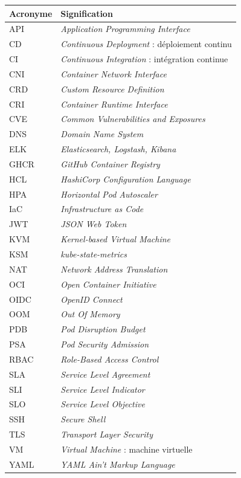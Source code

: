 \documentclass[12pt,a4paper,oneside]{report}
\begin{document}
\begin{longtable}{@{}p{3.2cm}p{11.0cm}@{}}
\toprule
\textbf{Acronyme} & \textbf{Signification} \\
\midrule
\endhead
API & \emph{Application Programming Interface} \\
CD & \emph{Continuous Deployment} : déploiement continu \\
CI & \emph{Continuous Integration} : intégration continue \\
CNI & \emph{Container Network Interface} \\
CRD & \emph{Custom Resource Definition} \\
CRI & \emph{Container Runtime Interface} \\
CVE & \emph{Common Vulnerabilities and Exposures} \\
DNS & \emph{Domain Name System} \\
ELK & \emph{Elasticsearch, Logstash, Kibana} \\
GHCR & \emph{GitHub Container Registry} \\
HCL & \emph{HashiCorp Configuration Language} \\
HPA & \emph{Horizontal Pod Autoscaler} \\
IaC & \emph{Infrastructure as Code} \\
JWT & \emph{JSON Web Token} \\
KVM & \emph{Kernel-based Virtual Machine} \\
KSM & \emph{kube-state-metrics} \\
NAT & \emph{Network Address Translation} \\
OCI & \emph{Open Container Initiative} \\
OIDC & \emph{OpenID Connect} \\
OOM & \emph{Out Of Memory} \\
PDB & \emph{Pod Disruption Budget} \\
PSA & \emph{Pod Security Admission} \\
RBAC & \emph{Role-Based Access Control} \\
SLA & \emph{Service Level Agreement} \\
SLI & \emph{Service Level Indicator} \\
SLO & \emph{Service Level Objective} \\
SSH & \emph{Secure Shell} \\
TLS & \emph{Transport Layer Security} \\
VM & \emph{Virtual Machine} : machine virtuelle \\
YAML & \emph{YAML Ain't Markup Language} \\
\bottomrule
\end{longtable}
\end{document}
